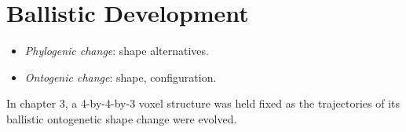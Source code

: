 




\section{Ballistic Development}

\begin{itemize}
    \item \textit{Phylogenic change}: shape alternatives.
    \item \textit{Ontogenic change}: shape, configuration.
\end{itemize}

\noindent
In chapter 3,
a 4-by-4-by-3 voxel
structure was held fixed as
the trajectories of its ballistic ontogenetic shape change
were evolved.

